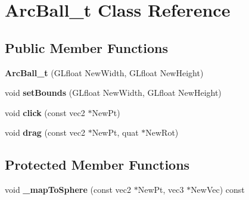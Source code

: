 \hypertarget{classArcBall__t}{\section{Arc\-Ball\-\_\-t Class Reference}
\label{classArcBall__t}
}
\subsection*{Public Member Functions}
\begin{DoxyCompactItemize}
\item 
\hypertarget{classArcBall__t_af0ab0bc3512889d777ad49dd7dfe388d}{{\bfseries Arc\-Ball\-\_\-t} (G\-Lfloat New\-Width, G\-Lfloat New\-Height)}\label{classArcBall__t_af0ab0bc3512889d777ad49dd7dfe388d}

\item 
\hypertarget{classArcBall__t_acc0216248bfd6d0b390c667a717fe881}{void {\bfseries set\-Bounds} (G\-Lfloat New\-Width, G\-Lfloat New\-Height)}\label{classArcBall__t_acc0216248bfd6d0b390c667a717fe881}

\item 
\hypertarget{classArcBall__t_ab457e36f9ef611c43d811e08c0100a74}{void {\bfseries click} (const vec2 $\ast$New\-Pt)}\label{classArcBall__t_ab457e36f9ef611c43d811e08c0100a74}

\item 
\hypertarget{classArcBall__t_a9902ea6c869db89bdadc393c362dd526}{void {\bfseries drag} (const vec2 $\ast$New\-Pt, quat $\ast$New\-Rot)}\label{classArcBall__t_a9902ea6c869db89bdadc393c362dd526}

\end{DoxyCompactItemize}
\subsection*{Protected Member Functions}
\begin{DoxyCompactItemize}
\item 
\hypertarget{classArcBall__t_a23147b991684651894ae66e89452d23d}{void {\bfseries \-\_\-map\-To\-Sphere} (const vec2 $\ast$New\-Pt, vec3 $\ast$New\-Vec) const }\label{classArcBall__t_a23147b991684651894ae66e89452d23d}

\end{DoxyCompactItemize}
